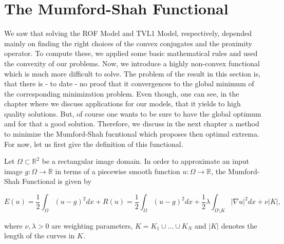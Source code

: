 \section{The Mumford-Shah Functional} %
\label{sec:the_mumford_shah_functional}
    
    We saw that solving the ROF Model and TVL1 Model, respectively, depended mainly on finding the right choices of the convex conjugates and the proximity operator. To compute these, we applied some basic mathematical rules and used the convexity of our problems. Now, we introduce a highly non-convex functional which is much more difficult to solve. The problem of the result in this section is, that there is - to date - no proof that it convergences to the global minimum of the corresponding minimization problem. Even though, one can see, in the chapter where we discuss applications for our models, that it yields to high quality solutions. But, of course one wants to be sure to have the global optimum and for that a good solution. Therefore, we discuss in the next chapter a method to minimize the Mumford-Shah fucntional which proposes then optimal extrema. For now, let us first give the definition of this functional.

    \begin{definition} %
    \label{def:the_mumford_shah_functional}

        Let $\Omega \subset \mathbb{R}^{2}$ be a rectangular image domain. In order to approximate an input image $g: \Omega \longrightarrow \mathbb{R}$ in terms of a piecewise smooth function $u: \Omega \longrightarrow \mathbb{R}$, the Mumford-Shah Functional is given by
                
                \begin{equation}
                    E(u) = \frac{1}{2} \int_{\Omega} (u - g)^{2} dx + R(u) = \frac{1}{2} \int_{\Omega} (u - g)^{2} dx + \frac{1}{2} \lambda \int_{\Omega \setminus K} |\nabla u|^{2} dx + \nu |K|,
                \end{equation}
                \label{eq:the_mumford_shah_functional}
            
            where $\nu, \lambda > 0$ are weighting parameters, $K = K_{1} \cup ... \cup K_{N}$ and $|K|$ denotes the length of the curves in $K$.

    \end{definition}

